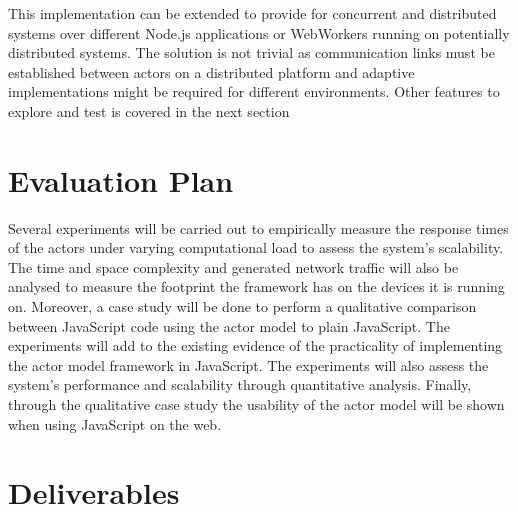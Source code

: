 \documentclass{report}
\begin{document}
This implementation can be extended to provide for concurrent and distributed systems over different Node.js applications or WebWorkers running on potentially distributed systems. The solution is not trivial as communication links must be established between actors on a distributed platform and adaptive implementations might be required for different environments. Other features to explore and test is covered in the next section
\section{Evaluation Plan}
Several experiments will be carried out to empirically measure the response times of the actors under varying computational load to assess the system’s scalability. The time and space complexity and generated network traffic will also be analysed to measure the footprint the framework has on the devices it is running on. Moreover, a case study will be done to perform a qualitative comparison between JavaScript code using the actor model to plain JavaScript. The experiments will add to the existing evidence of the practicality of implementing the actor model framework in JavaScript. The experiments will also assess the system's performance and scalability through quantitative analysis. Finally, through the qualitative case study the usability of the actor model will be shown when using JavaScript on the web.
\section{Deliverables}


\end{document}
